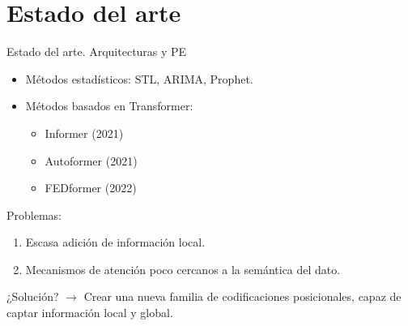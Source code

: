 \documentclass[compress]{beamer}
\begin{document}
	\section{Estado del arte}
	
	\begin{frame}{Estado del arte. Arquitecturas y PE}
		\begin{itemize}
			\item Métodos estadísticos: STL, ARIMA, Prophet.
			 
			\item Métodos basados en Transformer:
		
			\begin{itemize}
				\item Informer (2021)
				\item Autoformer (2021)
				\item FEDformer (2022)
			\end{itemize}
		\end{itemize}
		
		Problemas:
		\begin{enumerate}
			\item Escasa adición de información local.
			\item Mecanismos de atención poco cercanos a la semántica del dato.
		\end{enumerate}
		¿Solución? $\rightarrow$ Crear una nueva familia de codificaciones posicionales, capaz de captar información local y global.
	\end{frame}	 	
\end{document}
